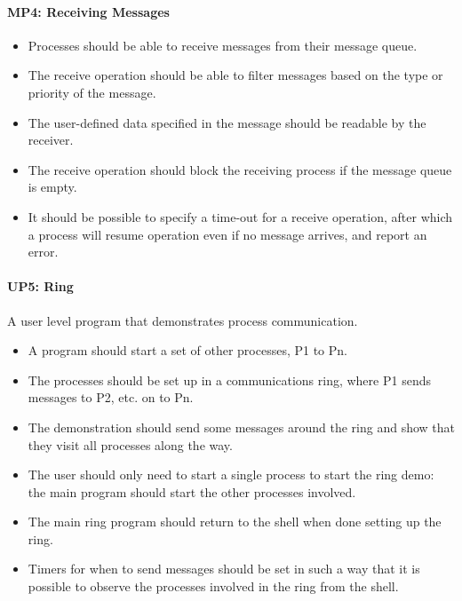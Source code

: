\paragraph*{MP4: Receiving Messages}

\begin{itemize}
  \item Processes should be able to receive messages from their message queue.
  \item  The receive operation should be able to filter messages based on the type or priority of the message.
  \item  The user-defined data specified in the message should be readable by the receiver.
  \item  The receive operation should block the receiving process if the message queue is empty.
  \item  It should be possible to specify a time-out for a receive operation, after which a process will resume operation even if no message arrives, and report an error.
\end{itemize}

\paragraph*{UP5: Ring}

A user level program that demonstrates process communication.

\begin{itemize}
  \item A program should start a set of other processes, P1 to Pn.
  \item  The processes should be set up in a communications ring, where P1 sends messages to P2, etc. on to Pn.
  \item  The demonstration should send some messages around the ring and show that they visit all processes along the way.
  \item  The user should only need to start a single process to start the ring demo: the main program should start the other processes involved.
  \item  The main ring program should return to the shell when done setting up the ring.
  \item  Timers for when to send messages should be set in such a way that it is possible to observe the processes involved in the ring from the shell.
\end{itemize}

